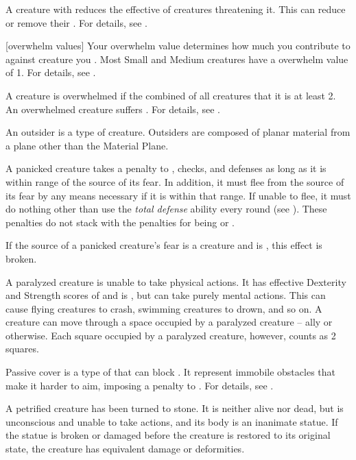  A creature with  reduces the effective  of creatures threatening it.
This can reduce or remove their .
For details, see .

[overwhelm values] Your overwhelm value determines how much you contribute to  against creature you .
Most Small and Medium creatures have a overwhelm value of 1.
For details, see .

 A creature is overwhelmed if the combined  of all creatures that  it is at least 2.
An overwhelmed creature suffers .
For details, see .

 An outsider is a type of creature.
Outsiders are composed of planar material from a plane other than the Material Plane.

 A panicked creature takes a  penalty to , checks, and defenses as long as it is within \rngmed range of the source of its fear.
In addition, it must flee from the source of its fear by any means necessary if it is within that range.
If unable to flee, it must do nothing other than use the \textit{total defense} ability every round (see ).
These penalties do not stack with the penalties for being \shaken or \panicked.

If the source of a panicked creature's fear is a creature and is , this effect is broken.

 A paralyzed creature is unable to take physical actions. It has effective Dexterity and Strength scores of  and is \helpless, but can take purely mental actions. This can cause flying creatures to crash, swimming creatures to drown, and so on. A creature can move through a space occupied by a paralyzed creature -- ally or otherwise. Each square occupied by a paralyzed creature, however, counts as 2 squares.

 Passive cover is a type of  that can block .
It represent immobile obstacles that make it harder to aim, imposing a  penalty to .
For details, see .

 A petrified creature has been turned to stone. It is neither alive nor dead, but is unconscious and unable to take actions, and its body is an inanimate statue. If the statue is broken or damaged before the creature is restored to its original state, the creature has equivalent damage or deformities.

